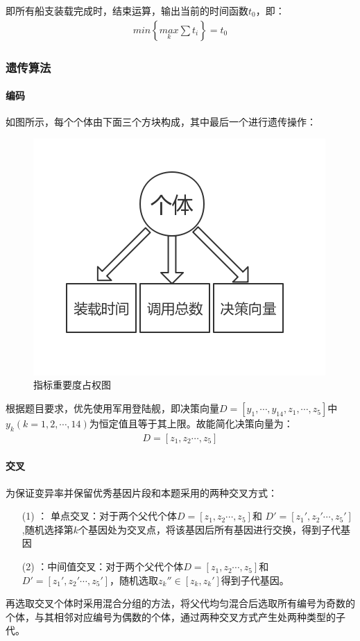 \documentclass{whutmod}
\begin{document}
		即所有船支装载完成时，结束运算，输出当前的时间函数$t_{0}$，即：
			\begin{gather*}
		min \left \{ \underset{k}{max}\sum t_{i} \right \}=t_{0}
			\end{gather*}

	\subsubsection{遗传算法}
	 \paragraph{编码}
	 如图所示，每个个体由下面三个方块构成，其中最后一个进行遗传操作：
	 	\begin{figure}[H]
	 	\centering
	 	\includegraphics[width=.5\textwidth]{figures/yichuan.jpg}
	 	\caption{指标重要度占权图}\label{yichuan}
	 	 \end{figure}
	 根据题目要求，优先使用军用登陆舰，即决策向量$D=[y_{1},\cdots,y_{14},z_{1},\cdots,z_{5}]$中$y_{k}(k=1,2,\cdots,14)$为恒定值且等于其上限。故能简化决策向量为：
	\begin{gather*}
	D=[z_{1},z_{2}\cdots,z_{5}]
	\end{gather*}
	 \paragraph{交叉}
	 为保证变异率并保留优秀基因片段和本题采用的两种交叉方式：
	\begin{itemize}
	\item [(1)]： 单点交叉：对于两个父代个体$D=[z_{1},z_{2}\cdots,z_{5}]$和	$D'=[z_{1}',z_{2}'\cdots,z_{5}']$,随机选择第$k$个基因处为交叉点，将该基因后所有基因进行交换，得到子代基因
	\item [(2)]：中间值交叉：对于两个父代个体$D=[z_{1},z_{2}\cdots,z_{5}]$和	$D'=[z_{1}',z_{2}'\cdots,z_{5}']$，随机选取$z_{k}''\in [z_{k},z_{k}']$得到子代基因。
    \end{itemize}
    再选取交叉个体时采用混合分组的方法，将父代均匀混合后选取所有编号为奇数的个体，与其相邻对应编号为偶数的个体，通过两种交叉方式产生处两种类型的子代。
\end{document}
